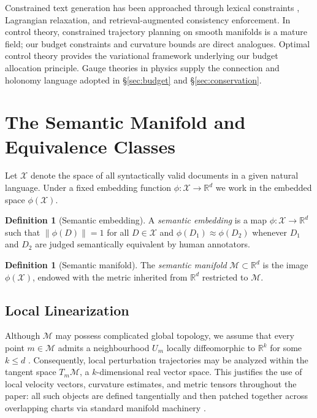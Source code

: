 \documentclass[12pt, a4paper]{article}
\theoremstyle{plain}
\theoremstyle{definition}
\newtheorem{definition}[theorem]{Definition}
\theoremstyle{remark}
\newcommand{\calX}{\mathcal{X}}
\newcommand{\calM}{\mathcal{M}}
\newcommand{\bR}{\mathbb{R}}
\newcommand{\norm}[1]{\left\lVert #1 \right\rVert}
\begin{document}
Constrained text generation has been approached through lexical constraints
\cite{hokamp2017lexically}, Lagrangian relaxation, and retrieval-augmented
consistency enforcement.  In control theory, constrained trajectory planning
on smooth manifolds \cite{lee2013smooth, docarmo1992riemannian} is a mature
field; our budget constraints and curvature bounds are direct analogues.
Optimal control theory \cite{liberzon2012optimal, bertsekas1995dynamic} provides
the variational framework underlying our budget allocation principle.  Gauge
theories in physics \cite{docarmo1992riemannian} supply the connection and
holonomy language adopted in \S\ref{sec:budget} and \S\ref{sec:conservation}.


\section{The Semantic Manifold and Equivalence Classes}
\label{sec:manifold}

Let $\calX$ denote the space of all syntactically valid documents in a given
natural language.  Under a fixed embedding function $\phi : \calX \to \bR^d$
we work in the embedded space $\phi(\calX)$.

\begin{definition}[Semantic embedding]
\label{def:embedding}
A \emph{semantic embedding} is a map $\phi : \calX \to \bR^d$ such that
$\norm{\phi(D)} = 1$ for all $D \in \calX$ and $\phi(D_1) \approx \phi(D_2)$
whenever $D_1$ and $D_2$ are judged semantically equivalent by human annotators.
\end{definition}

\begin{definition}[Semantic manifold]
\label{def:manifold}
The \emph{semantic manifold} $\calM \subset \bR^d$ is the image $\phi(\calX)$,
endowed with the metric inherited from $\bR^d$ restricted to $\calM$.
\end{definition}

\subsection{Local Linearization}

Although $\calM$ may possess complicated global topology, we assume that every
point $m \in \calM$ admits a neighbourhood $U_m$ locally diffeomorphic to
$\bR^k$ for some $k \le d$ \cite{lee2013smooth}.  Consequently, local
perturbation trajectories may be analyzed within the tangent space $T_m\calM$,
a $k$-dimensional real vector space.  This justifies the use of local velocity
vectors, curvature estimates, and metric tensors throughout the paper: all
such objects are defined tangentially and then patched together across
overlapping charts via standard manifold machinery \cite{docarmo1992riemannian}.
\end{document}
